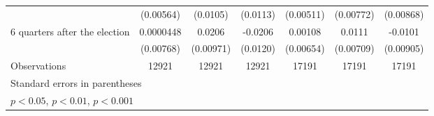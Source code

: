 \begin{table}[!ht]
\begin{tabular}{l*{6}{c}}
                    &   (0.00564)         &    (0.0105)         &    (0.0113)         &   (0.00511)         &   (0.00772)         &   (0.00868)         \\
[1em]
 6 quarters after the election&   0.0000448         &      0.0206\sym{*}  &     -0.0206         &     0.00108         &      0.0111         &     -0.0101         \\
                    &   (0.00768)         &   (0.00971)         &    (0.0120)         &   (0.00654)         &   (0.00709)         &   (0.00905)         \\
\hline
Observations        &       12921         &       12921         &       12921         &       17191         &       17191         &       17191         \\
\hline\hline
\multicolumn{7}{l}{\footnotesize Standard errors in parentheses}\\
\multicolumn{7}{l}{\footnotesize \sym{*} \(p<0.05\), \sym{**} \(p<0.01\), \sym{***} \(p<0.001\)}\\
\end{tabular}
\end{table}
